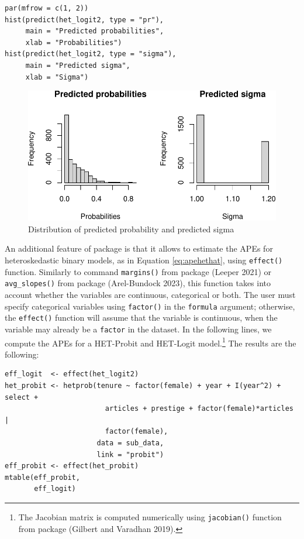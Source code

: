 \begin{verbatim}
par(mfrow = c(1, 2))
hist(predict(het_logit2, type = "pr"), 
     main = "Predicted probabilities", 
     xlab = "Probabilities")
hist(predict(het_logit2, type = "sigma"), 
     main = "Predicted sigma", 
     xlab = "Sigma")
\end{verbatim}

\begin{figure}
\centering
\includegraphics{IVHet_files/figure-latex/plothet-1.pdf}
\caption{\label{fig:plothet}Distribution of predicted probability and predicted sigma}
\end{figure}

An additional feature of  package is that it allows to estimate the APEs for heteroskedastic binary models, as in Equation \eqref{eq:apehethat}, using \texttt{effect()} function. Similarly to command \texttt{margins()} from  package (Leeper 2021) or \texttt{avg\_slopes()} from  package (Arel-Bundock 2023), this function takes into account whether the variables are continuous, categorical or both. The user must specify categorical variables using \texttt{factor()} in the \texttt{formula} argument; otherwise, the \texttt{effect()} function will assume that the variable is continuous, when the variable may already be a \texttt{factor} in the dataset. In the following lines, we compute the APEs for a HET-Probit and HET-Logit model.\footnote{The Jacobian matrix is computed numerically using \texttt{jacobian()} function from  package (Gilbert and Varadhan 2019).} The results are the following:

\begin{verbatim}
eff_logit  <- effect(het_logit2)
het_probit <- hetprob(tenure ~ factor(female) + year + I(year^2) + select +  
                        articles + prestige + factor(female)*articles | 
                        factor(female),              
                      data = sub_data,                        
                      link = "probit")
eff_probit <- effect(het_probit)
mtable(eff_probit,
       eff_logit)
\end{verbatim}

